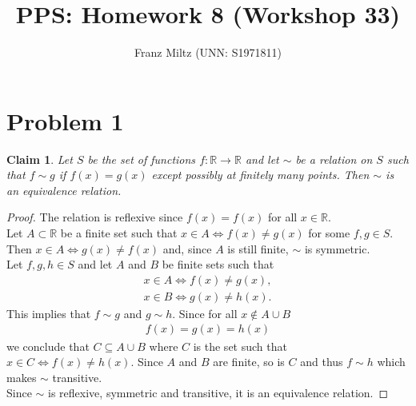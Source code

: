 \documentclass{article}
\title{PPS: Homework 8 (Workshop 33)}
\author{Franz Miltz (UNN: S1971811)}
\newcommand{\R}{\mathbb{R}}
\newtheorem{claim}[section]{Claim}
\begin{document}
\maketitle
\section*{Problem 1}
\begin{claim}
  Let $S$ be the set of functions $f:\R\to\R$ and let $\sim$ be a relation on $S$ such that $f\sim g$ if $f(x)=g(x)$ except possibly at finitely many points. 
  Then $\sim$ is an equivalence relation.
\end{claim}
\begin{proof}
  The relation is reflexive since $f(x)=f(x)$ for all $x\in\R$.\\
  Let $A\subset \R$ be a finite set such that 
  $
    x \in A \Leftrightarrow f(x)\not= g(x)
  $
  for some $f,g\in S$.
  Then 
  $
    x\in A \Leftrightarrow g(x)\not=f(x)
  $
  and, since $A$ is still finite, $\sim$ is symmetric.\\
  Let $f,g,h \in S$ and let $A$ and $B$ be finite sets such that 
  \begin{align*}
    x\in A \Leftrightarrow f(x)\not= g(x),\\
    x\in B \Leftrightarrow g(x)\not= h(x).
  \end{align*}
  This implies that $f\sim g$ and $g\sim h$. Since for all $x\not\in A\cup B$
  \begin{align*}
    f(x)=g(x)=h(x)
  \end{align*}
  we conclude that $C\subseteq A \cup B$ where $C$ is the set such that $x\in C \Leftrightarrow f(x)\not=h(x)$. 
  Since $A$ and $B$ are finite, so is $C$ and thus $f\sim h$ which makes $\sim$ transitive.\\
  Since $\sim$ is reflexive, symmetric and transitive, it is an equivalence relation. 
\end{proof}
\end{document}
